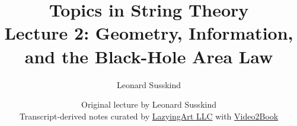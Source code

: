 \documentclass[11pt,oneside]{book}
\begin{document}
\frontmatter
\title{Topics in String Theory\\[0.5em]
\large Lecture 2: Geometry, Information, and the Black-Hole Area Law}
\author{Leonard Susskind}
\date{Original lecture by Leonard Susskind\\[0.4em]
Transcript-derived notes curated by
\href{https://lazying.art}{LazyingArt LLC} with
\href{https://github.com/lachlanchen/Video2Book}{Video2Book}}
\maketitle
\mainmatter

\end{document}
